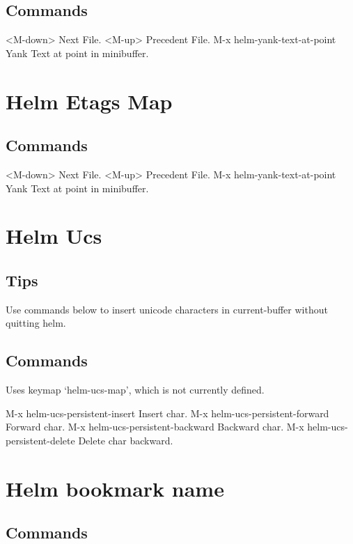 \documentclass[11pt]{article}
\begin{document}
\subsection{Commands}
\label{sec:org7bd22b3}

<M-down>		Next File.
<M-up>		Precedent File.
M-x helm-yank-text-at-point		Yank Text at point in minibuffer.

\section{Helm Etags Map}
\label{sec:org924bd75}

\subsection{Commands}
\label{sec:org9151ab4}

<M-down>		Next File.
<M-up>		Precedent File.
M-x helm-yank-text-at-point		Yank Text at point in minibuffer.

\section{Helm Ucs}
\label{sec:org9b1bf59}

\subsection{Tips}
\label{sec:org5cff668}

Use commands below to insert unicode characters
in current-buffer without quitting helm.

\subsection{Commands}
\label{sec:org95120b4}

Uses keymap ‘helm-ucs-map’, which is not currently defined.

M-x helm-ucs-persistent-insert		Insert char.
M-x helm-ucs-persistent-forward		Forward char.
M-x helm-ucs-persistent-backward		Backward char.
M-x helm-ucs-persistent-delete		Delete char backward.

\section{Helm bookmark name}
\label{sec:org49ecbae}

\subsection{Commands}
\label{sec:org2555d57}
\end{document}
